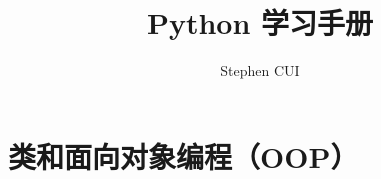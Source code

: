 \documentclass{book}
\author{Stephen CUI}
\title{Python 学习手册}
\begin{document}
\frontmatter
\tableofcontents
\mainmatter
% 
% 
% 
% 
% 
% 
% 
\part{类和面向对象编程（OOP）\label{p6}}



\end{document}

